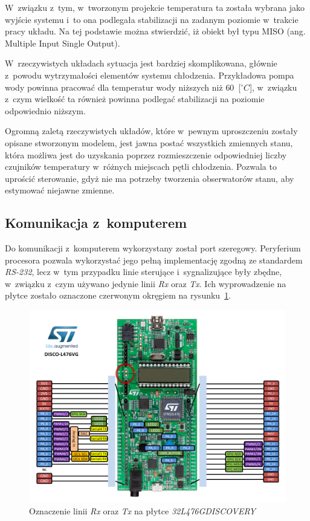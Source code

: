 W~związku z~tym, w~tworzonym projekcie temperatura ta została wybrana jako
wyjście systemu i~to ona podlegała stabilizacji na zadanym poziomie w~trakcie
pracy układu. Na tej podstawie można stwierdzić, iż obiekt był typu MISO (ang.
Multiple Input Single Output).

W~rzeczywistych układach sytuacja jest bardziej skomplikowana, głównie z~powodu
wytrzymałości elementów systemu chłodzenia. Przykładowa pompa wody
\cite{EKWBpump} powinna pracować dla temperatur wody niższych niż $60$~[$^\circ
C$], w~związku z~czym wielkość ta również powinna podlegać stabilizacji na
poziomie odpowiednio niższym.

Ogromną zaletą rzeczywistych układów, które w~pewnym uproszczeniu zostały
opisane stworzonym modelem, jest jawna postać wszystkich zmiennych stanu, która
możliwa jest do uzyskania poprzez rozmieszczenie odpowiedniej liczby czujników
temperatury w~różnych miejscach pętli chłodzenia. Pozwala to uprościć
sterowanie, gdyż nie ma potrzeby tworzenia obserwatorów stanu, aby estymować
niejawne zmienne.

\subsection{Komunikacja z~komputerem}
\indent

Do komunikacji z~komputerem wykorzystany został port szeregowy. Peryferium
procesora pozwala wykorzystać jego pełną implementację zgodną ze standardem
\textit{RS-232}, lecz w~tym przypadku linie sterujące i~sygnalizujące były
zbędne, w~związku z~czym używano jedynie linii \textit{Rx} oraz \textit{Tx}. Ich
wyprowadzenie na płytce zostało oznaczone czerwonym okręgiem na
rysunku~\ref{fig:discovery}.

\begin{figure}[!ht]
    \centering
    \includegraphics[width=\textwidth]{../img/discovery.png}
    \caption{Oznaczenie linii \textit{Rx} oraz \textit{Tx} na płytce
    \textit{32L476GDISCOVERY}}
    \label{fig:discovery}
\end{figure}

